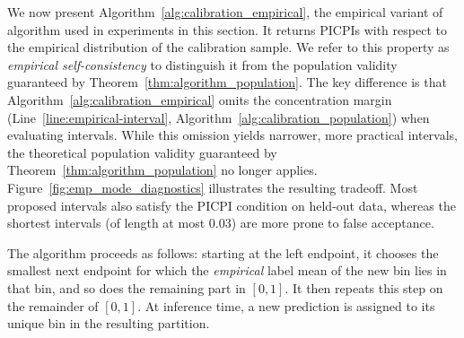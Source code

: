 \documentclass[11pt]{article}
\theoremstyle{statplain}
\theoremstyle{statdefinition}
\newcommand{\0}{\mathbf{0}}
\newcommand{\Xuelin}[1]{{\color{myGold}[Xuelin: #1]}}
\newcommand{\titleShort}{PICPI\xspace}
\newcommand{\titleShorts}{PICPIs\xspace}
\begin{document}
We now present Algorithm~\ref{alg:calibration_empirical}, the empirical variant of algorithm used in experiments in this section. It returns \titleShorts with respect to the empirical distribution of the calibration sample. We refer to this property as \emph{empirical self-consistency} to distinguish it from the population validity guaranteed by Theorem~\ref{thm:algorithm_population}. 
The key difference is that Algorithm~\ref{alg:calibration_empirical} omits the concentration margin (Line~\ref{line:empirical-interval}, Algorithm~\ref{alg:calibration_population}) when evaluating intervals.  
While this omission yields narrower, more practical intervals, the theoretical population validity guaranteed by Theorem~\ref{thm:algorithm_population} no longer applies.
Figure~\ref{fig:emp_mode_diagnostics} illustrates the resulting tradeoff. %
Most proposed intervals also satisfy the \titleShort condition on held-out data, whereas the shortest intervals (of length at most $0.03$) are more prone to false acceptance.

The algorithm proceeds as follows: starting at the left
endpoint, it chooses the smallest next endpoint for which the \emph{empirical} label mean of the new bin lies in that bin, and so does the remaining part in $[0,1]$. It then repeats this step on the remainder of $[0,1]$. At inference time, a new
prediction is assigned to its unique bin in the resulting partition.



\end{document}
